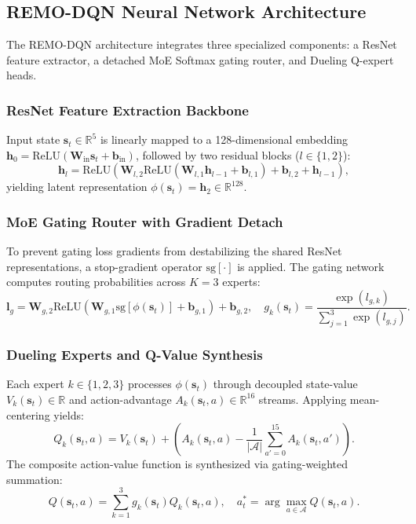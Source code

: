 \documentclass[journal]{IEEEtran}
\begin{document}
\subsection{REMO-DQN Neural Network Architecture}
The REMO-DQN architecture integrates three specialized components: a ResNet feature extractor, a detached MoE Softmax gating router, and Dueling Q-expert heads.

\subsubsection{ResNet Feature Extraction Backbone}
Input state $\mathbf{s}_t \in \mathbb{R}^5$ is linearly mapped to a 128-dimensional embedding $\mathbf{h}_0 = \text{ReLU}(\mathbf{W}_{\text{in}}\mathbf{s}_t + \mathbf{b}_{\text{in}})$, followed by two residual blocks ($l \in \{1, 2\}$):
\begin{equation}
\label{eq:resnet_backbone}
\mathbf{h}_l = \text{ReLU}\left( \mathbf{W}_{l, 2}\text{ReLU}(\mathbf{W}_{l, 1}\mathbf{h}_{l-1} + \mathbf{b}_{l, 1}) + \mathbf{b}_{l, 2} + \mathbf{h}_{l-1} \right),
\end{equation}
yielding latent representation $\phi(\mathbf{s}_t) = \mathbf{h}_2 \in \mathbb{R}^{128}$.

\subsubsection{MoE Gating Router with Gradient Detach}
To prevent gating loss gradients from destabilizing the shared ResNet representations, a stop-gradient operator $\text{sg}[\cdot]$ is applied. The gating network computes routing probabilities across $K = 3$ experts:
\begin{equation}
\label{eq:moe_router}
\mathbf{l}_g = \mathbf{W}_{g, 2}\text{ReLU}\left(\mathbf{W}_{g, 1}\text{sg}[\phi(\mathbf{s}_t)] + \mathbf{b}_{g, 1}\right) + \mathbf{b}_{g, 2}, \quad g_k(\mathbf{s}_t) = \frac{\exp(l_{g, k})}{\sum_{j=1}^3 \exp(l_{g, j})}.
\end{equation}

\subsubsection{Dueling Experts and Q-Value Synthesis}
Each expert $k \in \{1, 2, 3\}$ processes $\phi(\mathbf{s}_t)$ through decoupled state-value $V_k(\mathbf{s}_t) \in \mathbb{R}$ and action-advantage $A_k(\mathbf{s}_t, a) \in \mathbb{R}^{16}$ streams. Applying mean-centering yields:
\begin{equation}
\label{eq:dueling_expert}
Q_k(\mathbf{s}_t, a) = V_k(\mathbf{s}_t) + \left( A_k(\mathbf{s}_t, a) - \frac{1}{|\mathcal{A}|}\sum_{a'=0}^{15} A_k(\mathbf{s}_t, a') \right).
\end{equation}
The composite action-value function is synthesized via gating-weighted summation:
\begin{equation}
\label{eq:q_moe_sum}
Q(\mathbf{s}_t, a) = \sum_{k=1}^3 g_k(\mathbf{s}_t) Q_k(\mathbf{s}_t, a), \quad a_t^* = \arg\max_{a \in \mathcal{A}} Q(\mathbf{s}_t, a).
\end{equation}
\end{document}
